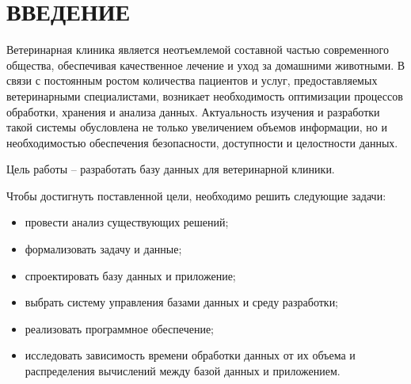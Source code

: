 \section*{ВВЕДЕНИЕ}

Ветеринарная клиника является неотъемлемой составной частью современного общества, обеспечивая качественное лечение и уход за домашними животными. В связи с постоянным ростом количества пациентов и услуг, предоставляемых ветеринарными специалистами, возникает необходимость оптимизации процессов обработки, хранения и анализа данных. Актуальность изучения и разработки такой системы обусловлена не только увеличением объемов информации, но и необходимостью обеспечения безопасности, доступности и целостности данных. 

Цель работы -- разработать базу данных для ветеринарной клиники.

Чтобы достигнуть поставленной цели, необходимо решить следующие задачи:
\begin{itemize}[label*=---]
	\item провести анализ существующих решений;
    \item формализовать задачу и данные;
    \item спроектировать базу данных и приложение;
    \item выбрать систему управления базами данных и среду разработки;
    \item реализовать программное обеспечение;
    \item исследовать зависимость времени обработки данных от их объема и распределения вычислений между базой данных и приложением.
\end{itemize}
